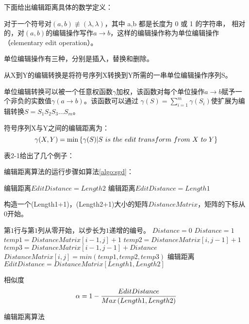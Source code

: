 下面给出编辑距离具体的数学定义\cite{Marzal1993Computation}：
\begin{edit_distance}[编辑距离]
	对于一个符号对$(a,b)\not\equiv(\lambda,\lambda)$，其中 a,b 都是长度为 0 或 1 的字符串，
	相对的，对$(a,b)$的编辑操作写作$a\rightarrow b$，这样的编辑操作称为单位编辑操作
	（elementary edit operation）。
\end{edit_distance}

单位编辑操作有三种，分别是插入，替换和删除。

\begin{edit_transform}[编辑转换]
	从X到Y的编辑转换是将符号序列X转换到Y所需的一串单位编辑操作序列S。
\end{edit_transform}

单位编辑转换可以被一个任意权函数$\gamma$加权，该函数对每个单位操作$a \rightarrow b$赋予一
个非负的实数值$\gamma ( a \rightarrow b ) $。该函数可以通过
$\gamma ( S ) = \sum\limits_{i=1}^m \gamma ( S_i ) $使扩展为编辑转换$ S = S_1 S_2 S_3 ... S_m $。

符号序列X与Y之间的编辑距离为：
\begin{equation}
	\centering
	\gamma ( X,Y ) = \min \left\{  \gamma ( S ) | S\ is\ the\ edit\ transform\ from\ X\ to\ Y \right\}
\end{equation}

表2-1给出了几个例子：


编辑距离算法的运行步骤如算法\ref{algo:sgd}：
\begin{algorithm}[h]
 {
  编辑距离$ EditDistance = Length2 $
}
 {
  编辑距离$ EditDistance = Length1 $
}
 {
  构造一个(Length1+1)，(Length2+1)大小的矩阵$DistanceMatrix$，矩阵的下标从$0$开始。

	 {
	  第$1$行与第$1$列从零开始，以步长为$1$递增的编号。
	}
	 {
	   {
		   {
		    $ Distance = 0 $
		  }
		   {
		    $ Distance = 1 $
		  }
		  $temp1 = DistanceMatrix[i-1, j] + 1$
			$temp2 = DistanceMatrix[i, j-1] + 1$
			$temp3 = DistanceMatrix[i-1, j-1] + Distance$
			$ DistanceMatrix[i,j] = min\left( temp1, temp2, temp3 \right) $
		}
	}
	编辑距离$ EditDistance = DistanceMatrix[Length1, Length2] $
}
相似度
\begin{equation}
  \centering
  \alpha = 1 - \frac{EditDistance}{Max\left(Length1, Length2\right)}
\end{equation}
\caption{编辑距离算法\cite{dulifeng2011}}
\label{algo:sgd}
\end{algorithm}

